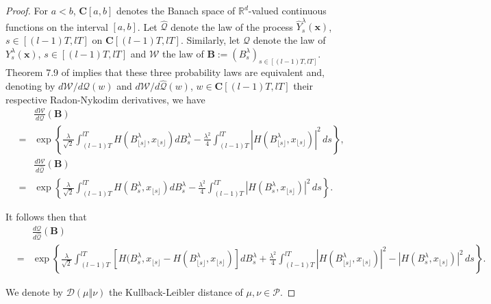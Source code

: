 \documentclass[a4paper,draft]{article}
\begin{document}
\begin{proof}
For $a<b$, $\mathbf{C}[a,b]$ denotes the Banach space of $\mathbb{R}^d$-valued
continuous functions on the interval $[a,b]$.
Let $\hat{\mathcal{Q}}$ denote the law of the process $\hat{Y}^{\lambda}_s(\mathbf{x})$, $s\in [(l-1)T,lT]$ on $\mathbf{C}[(l-1)T,lT]$.
Similarly, let $\mathcal{Q}$ denote the law of $Y_s^{\lambda}(\mathbf{x})$, $s\in [(l-1)T,lT]$ and 
$\mathcal{W}$ the law of $\mathbf{B}:=(B^{\lambda}_s)_{s\in [(l-1)T,lT]}$. Theorem 7.9 of \cite{ls} implies that these three
probability laws are equivalent and, denoting by $d\mathcal{W}/d\mathcal{Q}(w)$ and 
$d\mathcal{W}/d\hat{\mathcal{Q}}(w)$, $w\in\mathbf{C}[(l-1)T,lT]$ their respective
Radon-Nykodim derivatives, we have
\begin{eqnarray*}
& &\frac{d\mathcal{W}}{d\mathcal{Q}}(\mathbf{B})\\
&=& \exp\left\{\frac{\lambda}{\sqrt{2}}\int_{(l-1)T}^{lT} H(B^{\lambda}_{\lfloor s\rfloor},x_{\lfloor s\rfloor})
d{B}^{\lambda}_{s}
-\frac{\lambda^2}{4}\int_{(l-1)T}^{lT} 
|H(B^{\lambda}_{\lfloor s\rfloor},x_{\lfloor s\rfloor})|^2\, ds\right\},\\
& &\frac{d\mathcal{W}}{d\hat{\mathcal{Q}}}(\mathbf{B})\\
&=& \exp\left\{\frac{\lambda}{\sqrt{2}}\int_{(l-1)T}^{lT} H(B^{\lambda}_s,x_{\lfloor s\rfloor})d{B}^{\lambda}_{s}
-\frac{\lambda^2}{4}\int_{(l-1)T}^{lT} |H(B^{\lambda}_s,x_{\lfloor s\rfloor})|^2
\, ds\right\}.
\end{eqnarray*}

It follows then that
\begin{eqnarray}\label{dian}
& &\frac{d\mathcal{Q}}{d\hat{\mathcal{Q}}}(\mathbf{B})\\
\nonumber &=& \exp\left\{\frac{\lambda}{\sqrt{2}}\int_{(l-1)T}^{lT} [H(B^{\lambda}_s,x_{\lfloor s\rfloor}-
H(B^{\lambda}_{\lfloor s\rfloor},x_{\lfloor s\rfloor})]d{B}^{\lambda}_{s}
+\frac{\lambda^2}{4}\int_{(l-1)T}^{lT} 
|H(B^{\lambda}_{\lfloor s\rfloor},x_{\lfloor s\rfloor})|^2-|H(B^{\lambda}_s,x_{\lfloor s\rfloor})|^2\, ds\right\}.
\end{eqnarray}

We denote by $\mathcal{D}(\mu \Vert \nu)$
the Kullback-Leibler distance of $\mu,\nu\in\mathcal{P}$.


\end{proof}
\end{document}
